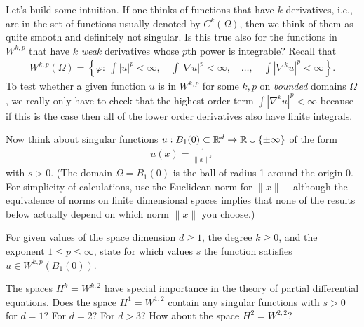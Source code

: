 \documentclass[12pt]{memoir}
\begin{document}
\begin{Ej}
    
Let's build some intuition. If one thinks of functions that have $k$
derivatives, i.e., are in the set of functions usually denoted by
$C^k(\Omega)$, then we think of them as quite smooth and definitely
not singular. Is this true also for the functions in $W^{k,p}$ that
have $k$ \textit{weak} derivatives whose $p$th power is integrable?
Recall that
\begin{align*}
  W^{k,p}(\Omega) = \left\{ \varphi: \ \int |u|^p < \infty,
  \quad
  \int |\nabla u|^p < \infty,
  \quad
  \ldots,
  \quad
  \int |\nabla^k u|^p < \infty
  \right\}.
\end{align*}
To test whether a given function $u$ is in $W^{k,p}$ for some $k,p$ on
\textit{bounded} domains $\Omega$,
we really only have to check that the highest order term $\int |\nabla^k u|^p < \infty$
because if this is the case then all of the lower order derivatives
also have finite integrals.

Now think about singular functions $u : B_1(0)\subset \mathbb{R}^d \rightarrow \mathbb{R}\cup\{\pm\infty\}$
of the form
\begin{align*}
  u(x) = \frac{1}{\|x\|^s}
\end{align*}
with $s>0$. (The domain $\Omega=B_1(0)$ is the ball of radius 1
around the origin 0. For simplicity of calculations, use the Euclidean norm
for $\|x\|$ -- although the equivalence of norms on finite dimensional
spaces implies that none of the results below actually depend on which
norm $\|x\|$ you choose.)

For given values of the space dimension $d\ge 1$, the degree $k\ge 0$,
and the exponent $1\le p\le \infty$, state for which values $s$ the
function satisfies $u \in W^{k,p}(B_1(0))$.

The spaces $H^k=W^{k,2}$ have special importance in the theory of
partial differential equations.
Does the space $H^1 = W^{1,2}$ contain any singular functions with $s>0$ for
$d=1$? For $d=2$? For $d>3$? How about the space $H^2=W^{2,2}$?
\end{Ej}
\end{document}
